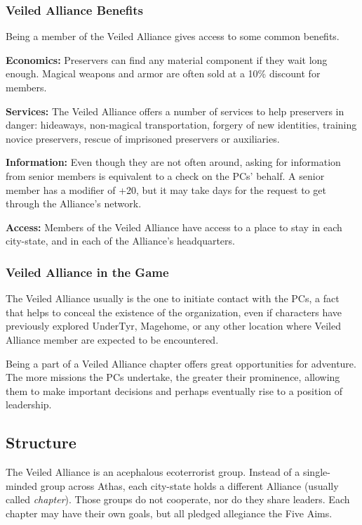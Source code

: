 \subsubsection{Veiled Alliance Benefits}
Being a member of the Veiled Alliance gives access to some common benefits.

\textbf{Economics:} Preservers can find any material component if they wait long enough. Magical weapons and armor are often sold at a 10\% discount for members.

\textbf{Services:} The Veiled Alliance offers a number of services to help preservers in danger: hideaways, non-magical transportation, forgery of new identities, training novice preservers, rescue of imprisoned preservers or auxiliaries.

\textbf{Information:} Even though they are not often around, asking for information from senior members is equivalent to a  check on the PCs' behalf. A senior member has a  modifier of +20, but it may take days for the request to get through the Alliance's network.

\textbf{Access:} Members of the Veiled Alliance have access to a place to stay in each city-state, and in each of the Alliance's headquarters.



\subsubsection{Veiled Alliance in the Game}
The Veiled Alliance usually is the one to initiate contact with the PCs, a fact that helps to conceal the existence of the organization, even if characters have previously explored UnderTyr, Magehome, or any other location where Veiled Alliance member are expected to be encountered.

Being a part of a Veiled Alliance chapter offers great opportunities for adventure. The more missions the PCs undertake, the greater their prominence, allowing them to make important decisions and perhaps eventually rise to a position of leadership.



\subsection{Structure}
The Veiled Alliance is an acephalous ecoterrorist group. Instead of a single-minded group across Athas, each city-state holds a different Alliance (usually called \emph{chapter}). Those groups do not cooperate, nor do they share leaders. Each chapter may have their own goals, but all pledged allegiance the Five Aims.

